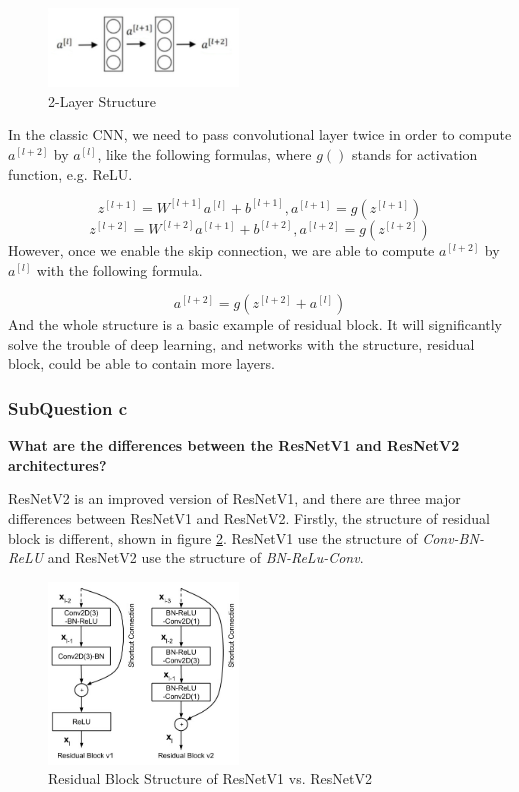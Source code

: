 \documentclass[conference]{IEEEtran}
\begin{document}
\begin{figure}[h] 
    \centering
    \includegraphics[width=0.45\textwidth]{./graphs/Task2/resnet-example.png}
    \caption{2-Layer Structure}
    \label{resex}
\end{figure}

In the classic CNN, we need to pass convolutional layer twice in order to compute $a^{[l+2]}$ by $a^{[l]}$, like the following formulas, where $g()$ stands for activation function, e.g. ReLU.

$$z^{[l+1]}=W^{[l+1]}a^{[l]}+b^{[l+1]}, a^{[l+1]}=g(z^{[l+1]})$$
$$z^{[l+2]}=W^{[l+2]}a^{[l+1]}+b^{[l+2]}, a^{[l+2]}=g(z^{[l+2]})$$
However, once we enable the skip connection, we are able to compute $a^{[l+2]}$ by $a^{[l]}$ with the following formula.

$$a^{[l+2]}=g(z^{[l+2]}+a^{[l]})$$
And the whole structure is a basic example of residual block. It will significantly solve the trouble of deep learning, and networks with the structure, residual block, could be able to contain more layers.

\subsubsection{SubQuestion c} \textbf{What are the differences between the ResNetV1 and ResNetV2 architectures?}

ResNetV2 is an improved version of ResNetV1, and there are three major differences between ResNetV1 and ResNetV2. Firstly, the structure of residual block is different, shown in figure \ref{resv1v2}.\cite{v1v2} ResNetV1 use the structure of \textit{Conv-BN-ReLU} and ResNetV2 use the structure of \textit{BN-ReLu-Conv}.

\begin{figure}[h] 
    \centering
    \includegraphics[width=0.45\textwidth]{./graphs/Task2/v1v2.png}
    \caption{Residual Block Structure of ResNetV1 vs. ResNetV2}
    \label{resv1v2}
\end{figure}
\end{document}
